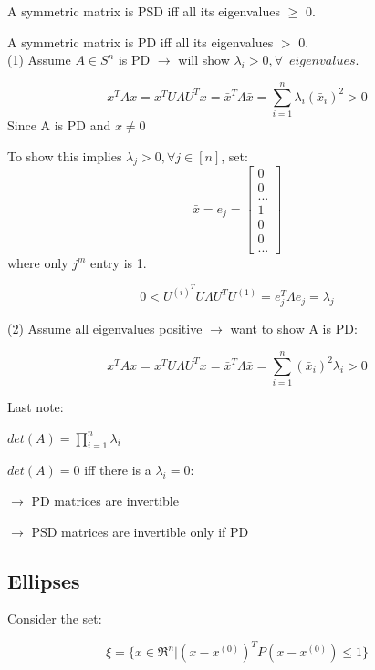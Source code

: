 A symmetric matrix is PSD iff all its eigenvalues $\geq$ 0.

A symmetric matrix is PD iff all its eigenvalues $>$ 0.\\


(1) Assume $A\in S^n$ is PD $\rightarrow$ will show $\lambda_i > 0, \forall\,\,\, eigenvalues$.   

\begin{equation*}
x^TAx = x^TU\Lambda U^Tx = \bar{x}^T\Lambda\bar{x} = \sum^n_{i=1}\lambda_i(\bar{x}_i)^2 >0
\end{equation*}
Since A is PD and $x\neq 0$

To show this implies $\lambda_j > 0, \forall j\in [n]$, set:
$$\bar{x} = e_j = 
\left[
\begin{matrix}
0\\
0\\
...\\
1\\
0\\
0\\
...
\end{matrix}
\right]
$$
where only $j^m$ entry is 1.

\begin{equation*}
0 < U^{(i)^T} U\Lambda U^TU^{(1)} =e_j^T\Lambda e_j = \lambda_j
\end{equation*}



(2) Assume all eigenvalues positive $\rightarrow$ want to show A is PD:

\begin{equation*}
x^TAx =x^TU\Lambda U^Tx = \bar{x}^T\Lambda \bar{x} = \sum^n_{i=1}(\bar{x}_i)^2\lambda_i > 0
\end{equation*}

Last note:

$det(A) = \prod^n_{i=1}\lambda_i$

$det(A) = 0$ iff there is a $\lambda_i = 0$:

$\rightarrow$ PD matrices are invertible

$\rightarrow$ PSD matrices are invertible only if PD




\subsection{Ellipses} 

Consider the set:

\begin{equation*}
\xi = \{x\in \Re^n | (x - x^{(0)})^T P(x - x^{(0)}) \leq 1 \}
\end{equation*}


